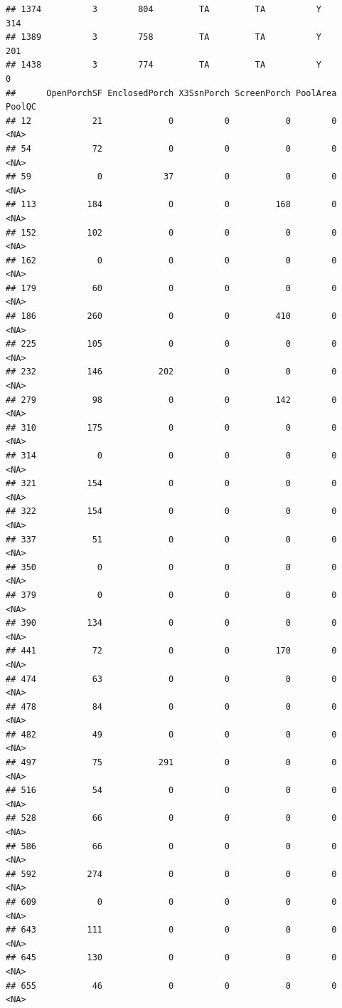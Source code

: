 \documentclass[]{article}
\begin{document}
\begin{verbatim}
## 1374          3        804         TA         TA          Y        314
## 1389          3        758         TA         TA          Y        201
## 1438          3        774         TA         TA          Y          0
##      OpenPorchSF EnclosedPorch X3SsnPorch ScreenPorch PoolArea PoolQC
## 12            21             0          0           0        0   <NA>
## 54            72             0          0           0        0   <NA>
## 59             0            37          0           0        0   <NA>
## 113          184             0          0         168        0   <NA>
## 152          102             0          0           0        0   <NA>
## 162            0             0          0           0        0   <NA>
## 179           60             0          0           0        0   <NA>
## 186          260             0          0         410        0   <NA>
## 225          105             0          0           0        0   <NA>
## 232          146           202          0           0        0   <NA>
## 279           98             0          0         142        0   <NA>
## 310          175             0          0           0        0   <NA>
## 314            0             0          0           0        0   <NA>
## 321          154             0          0           0        0   <NA>
## 322          154             0          0           0        0   <NA>
## 337           51             0          0           0        0   <NA>
## 350            0             0          0           0        0   <NA>
## 379            0             0          0           0        0   <NA>
## 390          134             0          0           0        0   <NA>
## 441           72             0          0         170        0   <NA>
## 474           63             0          0           0        0   <NA>
## 478           84             0          0           0        0   <NA>
## 482           49             0          0           0        0   <NA>
## 497           75           291          0           0        0   <NA>
## 516           54             0          0           0        0   <NA>
## 528           66             0          0           0        0   <NA>
## 586           66             0          0           0        0   <NA>
## 592          274             0          0           0        0   <NA>
## 609            0             0          0           0        0   <NA>
## 643          111             0          0           0        0   <NA>
## 645          130             0          0           0        0   <NA>
## 655           46             0          0           0        0   <NA>

\end{verbatim}
\end{document}
